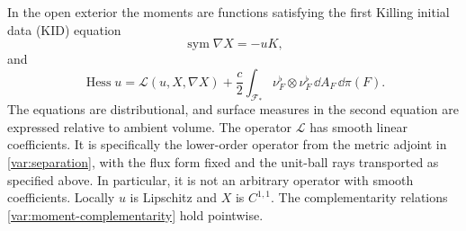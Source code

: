 \begin{proposition}
\label{var:moment-regularity}
In the open exterior the moments are functions satisfying the first Killing initial data (KID) equation
\begin{equation}
 \operatorname{sym}\nabla X=-uK,
 \label{var:first-kid}
\end{equation}
and
\begin{equation}
 \operatorname{Hess}u
  =\mathcal L(u,X,\nabla X)
    +\frac c2\int_{\mathcal F_*}
       \nu_F^\flat\otimes\nu_F^\flat\,
                       \dd A_F\,\dd\pi(F).
 \label{var:hessian-measure}
\end{equation}
The equations are distributional, and surface measures in the
second equation are expressed relative to ambient volume.
The operator $\mathcal L$ has smooth linear coefficients.
It is specifically the lower-order operator from the metric
adjoint in \eqref{var:separation}, with the flux form fixed
and the unit-ball rays transported as specified above.
In particular, it is not an arbitrary operator with smooth
coefficients.  Locally $u$ is Lipschitz and $X$ is $C^{1,1}$.
The complementarity relations
\eqref{var:moment-complementarity} hold pointwise.
\end{proposition}

